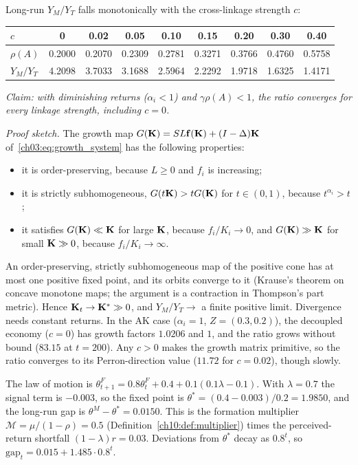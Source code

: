 \documentclass[../solutions_manual.tex]{subfiles}
\begin{document}
 Long-run $Y_M/Y_T$ falls monotonically with the cross-linkage strength $c$:
\begin{center}
\begin{tabular}{lcccccccc}
\toprule
$c$ & 0 & 0.02 & 0.05 & 0.10 & 0.15 & 0.20 & 0.30 & 0.40\\
\midrule
$\rho(A)$ & 0.2000 & 0.2070 & 0.2309 & 0.2781 & 0.3271 & 0.3766 & 0.4760 & 0.5758\\
$Y_M/Y_T$ & 4.2098 & 3.7033 & 3.1688 & 2.5964 & 2.2292 & 1.9718 & 1.6325 & 1.4171\\
\bottomrule
\end{tabular}
\end{center}
\emph{Claim: with diminishing returns ($\alpha_i < 1$) and $\gamma\rho(A) < 1$, the ratio converges for every linkage strength, including $c = 0$.}

\emph{Proof sketch.} The growth map $G(\mathbf{K}) = SL\mathbf f(\mathbf{K}) + (I - \Delta)\mathbf{K}$ of~\eqref{ch03:eq:growth_system} has the following properties:
\begin{itemize}
\item it is order-preserving, because $L \ge 0$ and $f_i$ is increasing;
\item it is strictly subhomogeneous, $G(t\mathbf{K}) > tG(\mathbf{K})$ for $t \in (0,1)$, because $t^{\alpha_i} > t$;
\item it satisfies $G(\mathbf{K}) \ll \mathbf{K}$ for large $\mathbf{K}$, because $f_i/K_i \to 0$, and $G(\mathbf{K}) \gg \mathbf{K}$ for small $\mathbf{K} \gg 0$, because $f_i/K_i \to \infty$.
\end{itemize}
An order-preserving, strictly subhomogeneous map of the positive cone has at most one positive fixed point, and its orbits converge to it (Krause's theorem on concave monotone maps; the argument is a contraction in Thompson's part metric). Hence $\mathbf{K}_t \to \mathbf{K}^* \gg 0$, and $Y_M/Y_T \to$ a finite positive limit. Divergence needs constant returns. In the AK case ($\alpha_i = 1$, $Z = (0.3, 0.2)$), the decoupled economy ($c = 0$) has growth factors $1.0206$ and $1$, and the ratio grows without bound ($83.15$ at $t = 200$). Any $c > 0$ makes the growth matrix primitive, so the ratio converges to its Perron-direction value ($11.72$ for $c = 0.02$), though slowly.


The law of motion is $\theta^F_{t+1} = 0.8\theta^F_t + 0.4 + 0.1(0.1\lambda - 0.1)$. With $\lambda = 0.7$ the signal term is $-0.003$, so the fixed point is $\theta^* = (0.4 - 0.003)/0.2 = 1.9850$, and the long-run gap is $\theta^M - \theta^* = 0.0150$. This is the formation multiplier $\mathcal M = \mu/(1-\rho) = 0.5$ (Definition~\ref{ch10:def:multiplier}) times the perceived-return shortfall $(1-\lambda)r = 0.03$. Deviations from $\theta^*$ decay as $0.8^t$, so $\text{gap}_t = 0.015 + 1.485\cdot0.8^t$.
\end{document}
